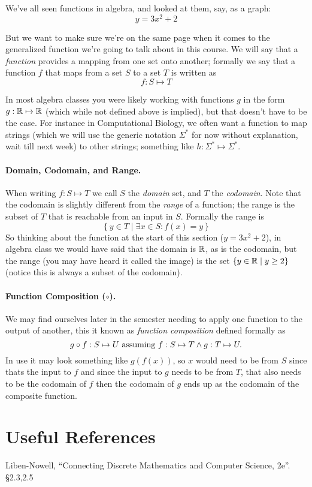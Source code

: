 We've all seen functions in algebra, and looked at them, say, as a graph:
\[
y = 3x^2 + 2
\]

But we want to make sure we're on the same page when it comes to the generalized function we're going to talk about in this course. 
We will say that a \emph{function} provides a mapping from one set onto another; 
formally we say that a function $f$ that maps from a set $S$ to a set $T$ is written as 
\[
f: S \mapsto T
\]

In most algebra classes you were likely working with functions $g$ in the form $g: \operatorname{\mathbb{R}} \mapsto\operatorname{\mathbb{R}}$ (which while not defined above is implied), 
but that doesn't have to be the case. 
For instance in Computational Biology, we often want a function to map strings 
(which we will use the generic notation $\Sigma^*$ for now without explanation, wait till next week)
to other strings; 
something like $h: \Sigma^* \mapsto \Sigma^*$. 

\paragraph{Domain, Codomain, and Range.}
When writing $f: S \mapsto T$ we call $S$ the \emph{domain} set, and $T$ the \emph{codomain}. 
Note that the codomain is slightly different from the \emph{range} of a function; 
the range is the subset of $T$ that is reachable from an input in $S$. 
Formally the range is 
\[
\left\{y \in T \mid \exists x \in S : f(x) = y\right\}
\]
So thinking about the function at the start of this section ($y = 3x^2 + 2$), 
in algebra class we would have said that the domain is $\operatorname{\mathbb{R}}$, as is the codomain, but the range (you may have heard it called the image) 
is the set $\left\{y \in \operatorname{\mathbb{R}} \mid y \ge 2\right\}$ (notice this is always a subset of the codomain). 

\paragraph{Function Composition ($\circ$).}
We may find ourselves later in the semester needing to apply one function to the output of another,
this it known as \emph{function composition} defined formally as
\[
g\circ f: S \mapsto U \textnormal{ assuming } f: S \mapsto T \wedge g : T \mapsto U.
\]
In use it may look something like $g\left(f\left(x\right)\right)$, 
so $x$ would need to be from $S$ since thats the input to $f$ and since the input to $g$ needs to be from $T$, 
that also needs to be the codomain of $f$ then the codomain of $g$ ends up as the codomain of the composite function. 

\section*{Useful References}
Liben-Nowell, ``Connecting Discrete Mathematics and Computer Science, 2e''. \S 2.3,2.5

  